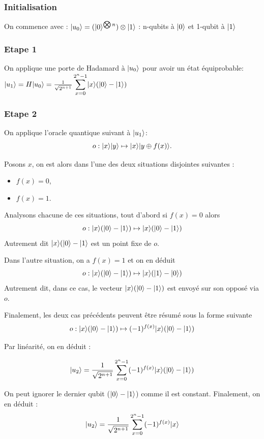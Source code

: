 \documentclass[12pt,a4paper]{article}
\DeclarePairedDelimiter\ket{\lvert}{\rangle}
\begin{document}
\subsubsection{Initialisation}
On commence avec :
$\ket{u_0} = (\ket{0}^{\bigotimes n}) \otimes \ket{1}$
: n-qubits à $\ket{0}$ et 1-qubit à $\ket{1}$

\subsubsection{Etape 1}

On applique une porte de Hadamard à $\ket{u_0}$ pour avoir un état équiprobable:
$\ket{u_1} = H\ket{u_0} = \frac{1}{\sqrt{2^{n + 1}}}
\displaystyle\sum_{x=0}^{2^n-1} \ket{x}(\ket{0} - \ket{1})$

\subsubsection{Etape 2}
On applique l'oracle quantique suivant à $\ket{u_1}$:
\[ o : \ket{x}\ket{y}\mapsto \ket{x}\ket{y\oplus f(x)}. \]

Posons $x$, on est alors dans l'une des deux situations disjointes suivantes :
\begin{itemize}
\item $f(x) = 0$,
\item $f(x) = 1$.
\end{itemize}

Analysons chacune de ces situations, tout d'abord si $f(x) = 0$ alors
\[
o : \ket{x}(\ket{0} - \ket{1}) \mapsto \ket{x}(\ket{0} - \ket{1})
\]
Autrement dit $\ket{x}(\ket{0} - \ket{1}$ est un  point fixe de $o$.

Dans l'autre situation, on a $f(x) = 1$ et on en déduit
\[
o : \ket{x}(\ket{0} - \ket{1}) \mapsto \ket{x}(\ket{1} - \ket{0})
\]
Autrement dit, dans ce cas, le vecteur $\ket{x}(\ket{0} - \ket{1})$
est envoyé sur son opposé via $o$.

Finalement, les deux cas précédents peuvent être résumé sous la forme suivante
\[
o : \ket{x}(\ket{0} - \ket{1}) \mapsto (-1)^{f(x)}\ket{x}(\ket{0} - \ket{1})
\]

Par linéarité, on en déduit :

\begin{equation}\ket{u_2} = \frac{1}{\sqrt{2^{n + 1}}} 
\displaystyle\sum_{x=0}^{2^n-1} (-1)^{f(x)}\ket{x}(\ket{0} - \ket{1}) 
\end{equation}

On peut ignorer le dernier qubit ($\ket{0} - \ket{1}$) comme il est
constant. Finalement, on en déduit :
\begin{equation}
\ket{u_2} = \frac{1}{\sqrt{2^{n + 1}}}
\displaystyle\sum_{x=0}^{2^n-1} (-1)^{f(x)}\ket{x}
\end{equation}
\end{document}

